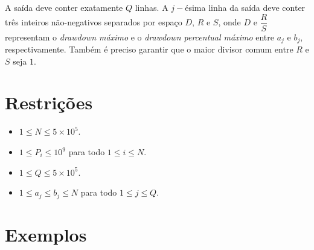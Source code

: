 A saída deve conter exatamente $Q$ linhas. A $j-$ésima linha da saída deve conter três inteiros não-negativos separados por espaço $D$, $R$ e $S$, onde $D$ e $\dfrac{R}{S}$ representam o \emph{drawdown máximo} e o \emph{drawdown percentual máximo} entre $a_j$ e $b_j$, respectivamente. Também é preciso garantir que o maior divisor comum entre $R$ e $S$ seja $1$. 

\section*{Restrições}

\begin{itemize}
    \item $1 \leq N \leq 5\times{10}^5$.
    \item $1 \leq P_i \leq {10}^9$ para todo $1 \leq i \leq N$.
    \item $1 \leq Q \leq 5\times{10}^5$.
    \item $1 \leq a_j \leq b_j \leq N$ para todo $1 \leq j \leq Q$.
\end{itemize}


\section*{Exemplos}

\exemplo
